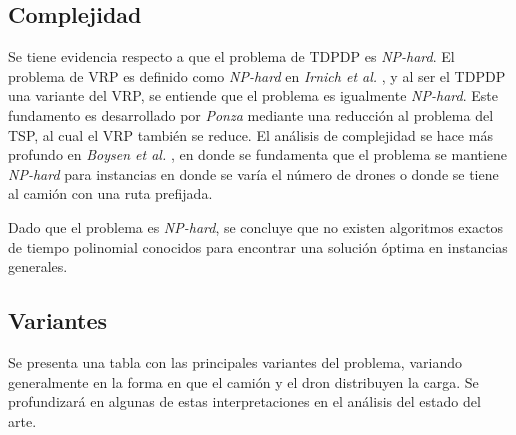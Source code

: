 \subsection{Complejidad}

Se tiene evidencia respecto a que el problema de TDPDP es \textit{NP-hard}. El problema de VRP es definido como \textit{NP-hard} en \textit{Irnich et al.} \cite{Irnich2014FamilyVRP}, y al ser el TDPDP una variante del VRP, se entiende que el problema es igualmente \textit{NP-hard}. Este fundamento es desarrollado por \textit{Ponza} \cite{ponza2016optimization} mediante una reducción al problema del TSP, al cual el VRP también se reduce. El análisis de complejidad se hace más profundo en \textit{Boysen et al.} \cite{boysen2018drone}, en donde se fundamenta que el problema se mantiene \textit{NP-hard} para instancias en donde se varía el número de drones o donde se tiene al camión con una ruta prefijada.

Dado que el problema es \textit{NP-hard}, se concluye que no existen algoritmos exactos de tiempo polinomial conocidos para encontrar una solución óptima en instancias generales.

\subsection{Variantes}

Se presenta una tabla con las principales variantes del problema, variando generalmente en la forma en que el camión y el dron distribuyen la carga. Se profundizará en algunas de estas interpretaciones en el análisis del estado del arte.

